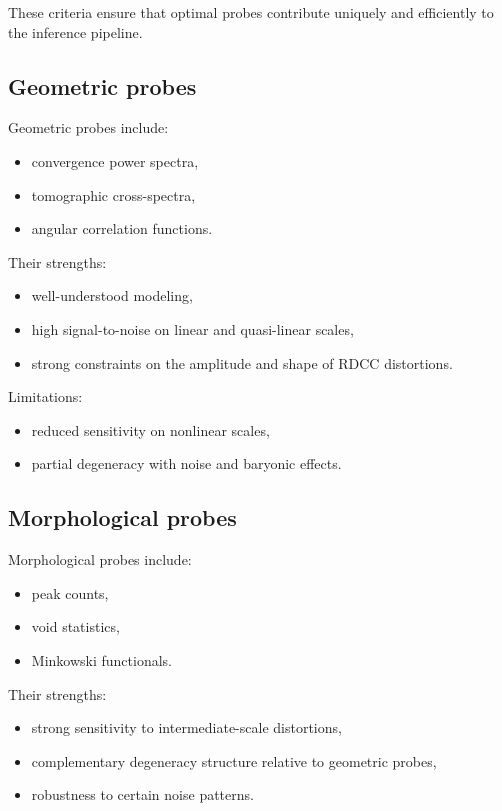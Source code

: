 \documentclass[11pt,a4paper]{article}
\begin{document}
These criteria ensure that optimal probes contribute uniquely and efficiently 
to the inference pipeline.

\subsection{Geometric probes}

Geometric probes include:
\begin{itemize}
    \item convergence power spectra,
    \item tomographic cross-spectra,
    \item angular correlation functions.
\end{itemize}

Their strengths:
\begin{itemize}
    \item well-understood modeling,
    \item high signal-to-noise on linear and quasi-linear scales,
    \item strong constraints on the amplitude and shape of RDCC distortions.
\end{itemize}

Limitations:
\begin{itemize}
    \item reduced sensitivity on nonlinear scales,
    \item partial degeneracy with noise and baryonic effects.
\end{itemize}

\subsection{Morphological probes}

Morphological probes include:
\begin{itemize}
    \item peak counts,
    \item void statistics,
    \item Minkowski functionals.
\end{itemize}

Their strengths:
\begin{itemize}
    \item strong sensitivity to intermediate-scale distortions,
    \item complementary degeneracy structure relative to geometric probes,
    \item robustness to certain noise patterns.
\end{itemize}
\end{document}
